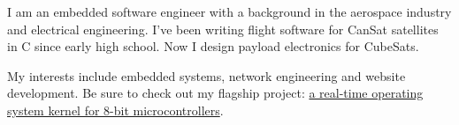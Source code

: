 \documentclass[letter,10pt]{article}
\begin{document}
    \begin{justify}
        I am an embedded software engineer with a background in the aerospace industry and electrical engineering. I've been writing flight software for CanSat satellites in C since early high school. Now I design payload electronics for CubeSats.
        \setlength{\parskip}{1em}
        \setlength{\parindent}{0em}

        My interests include embedded systems, network engineering and website development. Be sure to check out my flagship project: \href{https://github.com/cansat-ptl/cubesat-rtos}{a real-time operating system kernel for 8-bit microcontrollers}.
    \end{justify}
\end{document}
